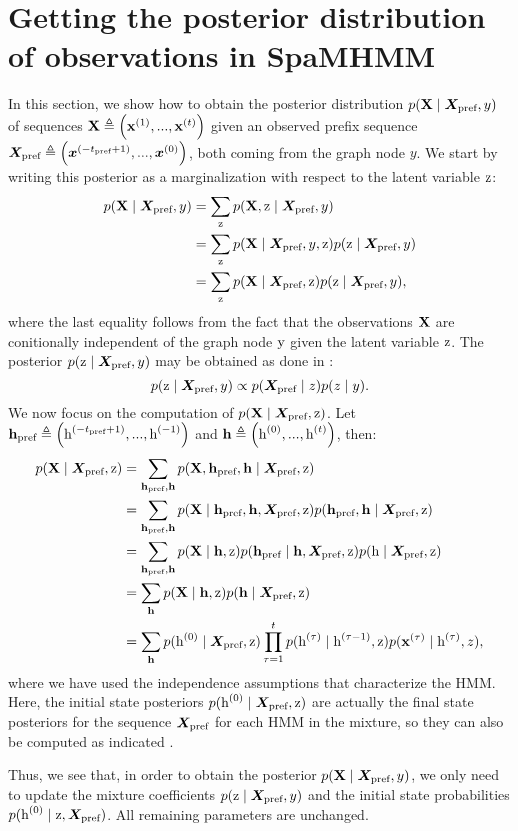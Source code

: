 \section{Getting the posterior distribution of observations in SpaMHMM}
\label{sec:posterior_proof}
In this section, we show how to obtain the posterior distribution $p({\mathbf{X}} \mid {\bm{X}}_\text{pref}, y)$ of sequences ${\mathbf{X}} \triangleq \left({\mathbf{x}}^{(1)}, ...,{\mathbf{x}}^{(t)}\right)$ given an observed prefix sequence ${\bm{X}}_\text{pref} \triangleq \left({\bm{x}}^{(-t_\text{pref}+1)}, ...,{\bm{x}}^{(0)}\right)$, both coming from the graph node $y$. We start by writing this posterior as a marginalization with respect to the latent variable ${\textnormal{z}}$:
\begin{align}
\label{mhmm_posterior}
p({\mathbf{X}} \mid {\bm{X}}_\text{pref}, y) &= \sum_{{\textnormal{z}}} p({\mathbf{X}}, {\textnormal{z}} \mid {\bm{X}}_\text{pref}, y)\nonumber\\
&= \sum_{{\textnormal{z}}} p({\mathbf{X}} \mid {\bm{X}}_\text{pref}, y, {\textnormal{z}}) p({\textnormal{z}} \mid {\bm{X}}_\text{pref}, y) \nonumber\\
&= \sum_{{\textnormal{z}}} p({\mathbf{X}} \mid {\bm{X}}_\text{pref}, {\textnormal{z}}) p({\textnormal{z}} \mid {\bm{X}}_\text{pref}, y),
\end{align}
where the last equality follows from the fact that the observations ${\mathbf{X}}$ are conitionally independent of the graph node ${\textnormal{y}}$ given the latent variable ${\textnormal{z}}$. The posterior $p({\textnormal{z}} \mid {\bm{X}}_\text{pref}, y)$ may be obtained as done in :
\begin{equation}
p({\textnormal{z}} \mid {\bm{X}}_\text{pref}, y) \propto p({\bm{X}}_\text{pref} \mid z)p(z \mid y).
\end{equation}
We now focus on the computation of $p({\mathbf{X}} \mid {\bm{X}}_\text{pref}, {\textnormal{z}})$. Let ${\mathbf{h}}_\text{pref} \triangleq \left({\textnormal{h}}^{(-t_\text{pref}+1)}, ...,{\textnormal{h}}^{(-1)}\right)$ and ${\mathbf{h}} \triangleq \left({\textnormal{h}}^{(0)}, ...,{\textnormal{h}}^{(t)}\right)$, then:
\begin{align}
p({\mathbf{X}} \mid {\bm{X}}_\text{pref}, {\textnormal{z}}) &= \sum_{{\mathbf{h}}_\text{pref}, {\mathbf{h}}} p({\mathbf{X}}, {\mathbf{h}}_\text{pref}, {\mathbf{h}} \mid {\bm{X}}_\text{pref}, {\textnormal{z}}) \nonumber\\
&= \sum_{{\mathbf{h}}_\text{pref}, {\mathbf{h}}} p({\mathbf{X}} \mid {\mathbf{h}}_\text{pref}, {\mathbf{h}}, {\bm{X}}_\text{pref}, {\textnormal{z}}) p({\mathbf{h}}_\text{pref}, {\mathbf{h}} \mid {\bm{X}}_\text{pref}, {\textnormal{z}}) \nonumber\\
&= \sum_{{\mathbf{h}}_\text{pref}, {\mathbf{h}}} p({\mathbf{X}} \mid {\mathbf{h}}, {\textnormal{z}}) p({\mathbf{h}}_\text{pref} \mid {\mathbf{h}}, {\bm{X}}_\text{pref}, {\textnormal{z}}) p({\textnormal{h}} \mid {\bm{X}}_\text{pref}, {\textnormal{z}}) \nonumber\\
&= \sum_{{\mathbf{h}}} p({\mathbf{X}} \mid {\mathbf{h}}, {\textnormal{z}}) p({\mathbf{h}} \mid {\bm{X}}_\text{pref}, {\textnormal{z}}) \nonumber\\
&= \sum_{{\mathbf{h}}} p({\textnormal{h}}^{(0)} \mid {\bm{X}}_\text{pref}, {\textnormal{z}}) \prod_{\tau=1}^{t} p({\textnormal{h}}^{(\tau)} \mid {\textnormal{h}}^{(\tau-1)}, {\textnormal{z}}) p({\mathbf{x}}^{(\tau)} \mid {\textnormal{h}}^{(\tau)}, z),
\end{align}
where we have used the independence assumptions that characterize the HMM. Here, the initial state posteriors $p({\textnormal{h}}^{(0)} \mid {\bm{X}}_\text{pref}, {\textnormal{z}})$ are actually the final state posteriors for the sequence ${\bm{X}}_\text{pref}$ for each HMM in the mixture, so they can also be computed as indicated .

Thus, we see that, in order to obtain the posterior $p({\mathbf{X}} \mid {\bm{X}}_\text{pref}, y)$, we only need to update the mixture coefficients $p({\textnormal{z}} \mid {\bm{X}}_\text{pref}, y)$ and the initial state probabilities $p({\textnormal{h}}^{(0)} \mid {\textnormal{z}}, {\bm{X}}_\text{pref})$. All remaining parameters are unchanged.